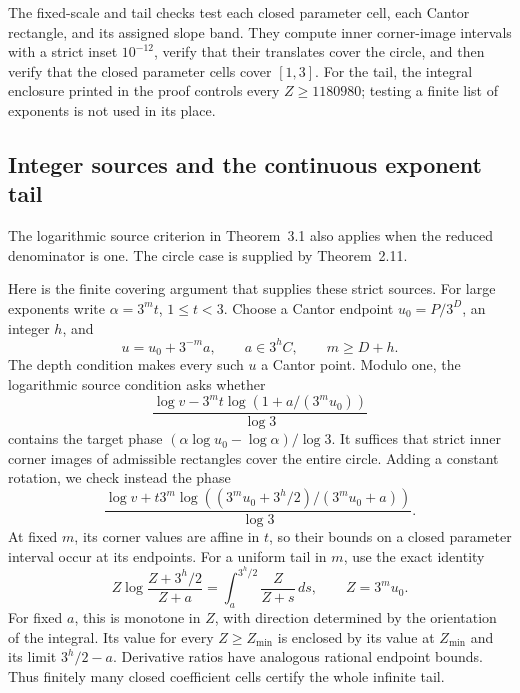 \documentclass[11pt,a4paper]{article}
\begin{document}
The fixed-scale and tail checks test each closed parameter cell,
each Cantor rectangle, and its assigned slope band.
They compute inner corner-image intervals
with a strict inset \(10^{-12}\), verify that their translates
cover the circle, and then verify that the closed parameter
cells cover \([1,3]\).
For the tail, the integral enclosure printed in the proof
controls every \(Z\geq1180980\); testing a finite list of
exponents is not used in its place.

\subsection{Integer sources and the continuous exponent tail}\label{app:integer-certificates}
The logarithmic source criterion in Theorem~3.1 also applies when the reduced denominator is one. The circle case is supplied by Theorem~2.11.

Here is the finite covering argument that supplies these strict
sources. For large exponents write \(\alpha=3^m t\), \(1\leq t<3\).
Choose a Cantor endpoint \(u_0=P/3^D\), an integer \(h\), and
\[
u=u_0+3^{-m}a,\qquad a\in3^hC,\qquad m\geq D+h .
\]
The depth condition makes every such \(u\) a Cantor point.
Modulo one, the logarithmic source condition asks whether
\[
\frac{\log v-3^mt\log(1+a/(3^mu_0))}{\log3}
\]
contains the target phase
\((\alpha\log u_0-\log \alpha)/\log3\).
It suffices that strict inner corner images of admissible
rectangles cover the entire circle. Adding a constant rotation,
we check instead the phase
\[
\frac{\log v+t3^m
        \log((3^mu_0+3^h/2)/(3^mu_0+a))}{\log3}.
\]
At fixed \(m\), its corner values are affine in \(t\), so their
bounds on a closed parameter interval occur at its endpoints.
For a uniform tail in \(m\), use the exact identity
\[
Z\log\frac{Z+3^h/2}{Z+a}
       =\int_a^{3^h/2}\frac{Z}{Z+s}\,ds,\qquad Z=3^mu_0.
\]
For fixed \(a\), this is monotone in \(Z\), with direction
determined by the orientation of the integral. Its value for
every \(Z\geq Z_{\min}\) is enclosed by its value at \(Z_{\min}\)
and its limit \(3^h/2-a\). Derivative ratios have analogous
rational endpoint bounds. Thus finitely many closed coefficient
cells certify the whole infinite tail.
\end{document}
